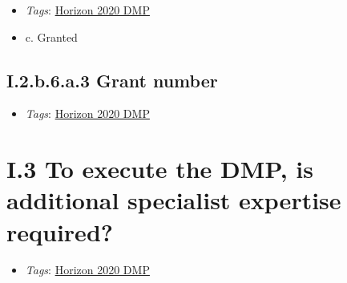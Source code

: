 \documentclass[a4paper,12pt]{report}
\begin{document}
\begin{itemize}
  \item \textit{Tags}: \ul{Horizon 2020 DMP}
  \end{itemize}




\begin{itemize}
  \item[\CheckmarkBold] c. Granted
\end{itemize}





\subsection*{\protect\textcolor{colorSecId}{I.2.b.6.a.3} Grant number}

\label{1e85da40-bbfc-4180-903e-6c569ed2da38.c3dabaaf-c946-4a0d-889c-ede966f97667.afc53854-30c4-4236-a5be-7e49ad186b95.36a87eac-402d-43fb-a0df-ac5963bdf87d.c7be7c76-46fa-4a86-a9c9-ed2f0102178e.1ccbd0bb-4263-4240-9dc5-936ef09eef53}


\begin{itemize}
  \item \textit{Tags}: \ul{Horizon 2020 DMP}
  \end{itemize}










\section*{\protect\textcolor{colorSecId}{I.3} To execute the DMP, is additional specialist expertise required?}

\label{1e85da40-bbfc-4180-903e-6c569ed2da38.83c0d09d-e74c-4c81-a52c-aaa2e18415ac}


\begin{itemize}
  \item \textit{Tags}: \ul{Horizon 2020 DMP}
  \end{itemize}
\end{document}
